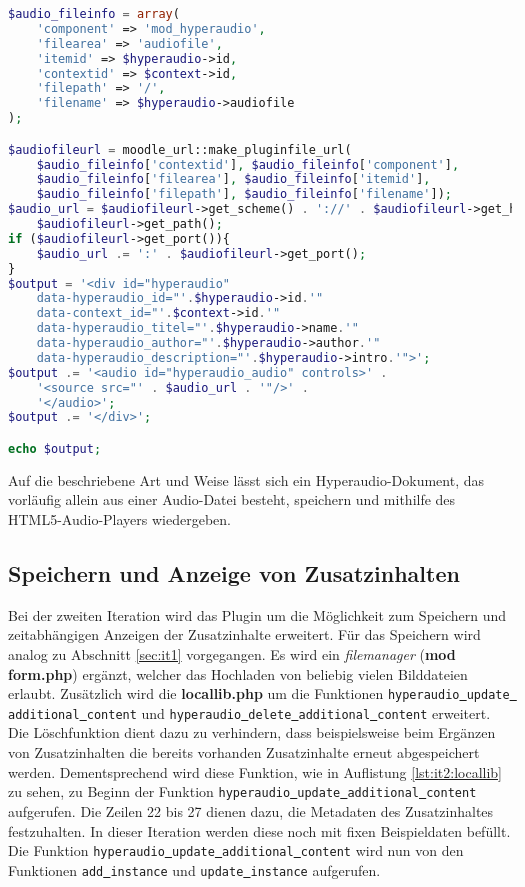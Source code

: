 \begin{lstlisting}[language=php,
             linewidth=\textwidth,
             caption={Ausschnitt der \textbf{renderer.php} in der 1. Iteration},
             label={lst:it1:renderer}]
$audio_fileinfo = array(
    'component' => 'mod_hyperaudio',
    'filearea' => 'audiofile',
    'itemid' => $hyperaudio->id,
    'contextid' => $context->id,
    'filepath' => '/',
    'filename' => $hyperaudio->audiofile
);

$audiofileurl = moodle_url::make_pluginfile_url(
    $audio_fileinfo['contextid'], $audio_fileinfo['component'],
    $audio_fileinfo['filearea'], $audio_fileinfo['itemid'],
    $audio_fileinfo['filepath'], $audio_fileinfo['filename']);
$audio_url = $audiofileurl->get_scheme() . '://' . $audiofileurl->get_host() .
    $audiofileurl->get_path();
if ($audiofileurl->get_port()){
    $audio_url .= ':' . $audiofileurl->get_port();
}
$output = '<div id="hyperaudio" 
    data-hyperaudio_id="'.$hyperaudio->id.'"
    data-context_id="'.$context->id.'"
    data-hyperaudio_titel="'.$hyperaudio->name.'"
    data-hyperaudio_author="'.$hyperaudio->author.'"
    data-hyperaudio_description="'.$hyperaudio->intro.'">';
$output .= '<audio id="hyperaudio_audio" controls>' .
    '<source src="' . $audio_url . '"/>' .
    '</audio>';
$output .= '</div>';

echo $output;
\end{lstlisting}

Auf die beschriebene Art und Weise lässt sich ein Hyperaudio-Dokument, das vorläufig allein aus einer Audio-Datei besteht, speichern und mithilfe des HTML5-Audio-Players wiedergeben.


\subsection{Speichern und Anzeige von Zusatzinhalten}
Bei der zweiten Iteration wird das Plugin um die Möglichkeit zum Speichern und zeitabhängigen Anzeigen der Zusatzinhalte erweitert. Für das Speichern wird analog zu Abschnitt \ref{sec:it1} vorgegangen. Es wird ein \textit{filemanager} (\textbf{mod\underline{{ }}form.php}) ergänzt, welcher das Hochladen von beliebig vielen Bilddateien erlaubt. Zusätzlich wird die \textbf{locallib.php} um die Funktionen \mbox{\texttt{hyperaudio\underline{{ }}update\underline{{ }}additional\underline{{ }}content}} und \mbox{\texttt{hyperaudio\underline{{ }}delete\underline{{ }}additional\underline{{ }}content}} erweitert. Die Löschfunktion dient dazu zu verhindern, dass beispielsweise beim Ergänzen von Zusatzinhalten die bereits vorhanden Zusatzinhalte erneut abgespeichert werden. Dementsprechend wird diese Funktion, wie in Auflistung \ref{lst:it2:locallib} zu sehen, zu Beginn der Funktion \mbox{\texttt{hyperaudio\underline{{ }}update\underline{{ }}additional\underline{{ }}content}} aufgerufen. Die Zeilen 22 bis 27 dienen dazu, die Metadaten des Zusatzinhaltes festzuhalten. In dieser Iteration werden diese noch mit fixen Beispieldaten befüllt. Die Funktion \mbox{\texttt{hyperaudio\underline{{ }}update\underline{{ }}additional\underline{{ }}content}} wird nun von den Funktionen \texttt{add\underline{{ }}instance} und \texttt{update\underline{{ }}instance} aufgerufen.

